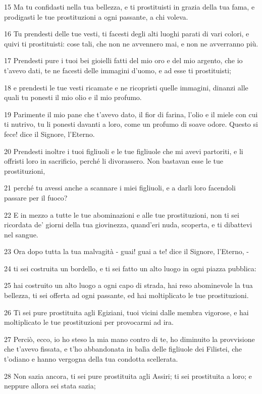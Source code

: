 \par 15 Ma tu confidasti nella tua bellezza, e ti prostituisti in grazia della tua fama, e prodigasti le tue prostituzioni a ogni passante, a chi voleva.
\par 16 Tu prendesti delle tue vesti, ti facesti degli alti luoghi parati di vari colori, e quivi ti prostituisti: cose tali, che non ne avvennero mai, e non ne avverranno più.
\par 17 Prendesti pure i tuoi bei gioielli fatti del mio oro e del mio argento, che io t'avevo dati, te ne facesti delle immagini d'uomo, e ad esse ti prostituisti;
\par 18 e prendesti le tue vesti ricamate e ne ricopristi quelle immagini, dinanzi alle quali tu ponesti il mio olio e il mio profumo.
\par 19 Parimente il mio pane che t'avevo dato, il fior di farina, l'olio e il miele con cui ti nutrivo, tu li ponesti davanti a loro, come un profumo di soave odore. Questo si fece! dice il Signore, l'Eterno.
\par 20 Prendesti inoltre i tuoi figliuoli e le tue figliuole che mi avevi partoriti, e li offristi loro in sacrificio, perché li divorassero. Non bastavan esse le tue prostituzioni,
\par 21 perché tu avessi anche a scannare i miei figliuoli, e a darli loro facendoli passare per il fuoco?
\par 22 E in mezzo a tutte le tue abominazioni e alle tue prostituzioni, non ti sei ricordata de' giorni della tua giovinezza, quand'eri nuda, scoperta, e ti dibattevi nel sangue.
\par 23 Ora dopo tutta la tua malvagità - guai! guai a te! dice il Signore, l'Eterno, -
\par 24 ti sei costruita un bordello, e ti sei fatto un alto luogo in ogni piazza pubblica:
\par 25 hai costruito un alto luogo a ogni capo di strada, hai reso abominevole la tua bellezza, ti sei offerta ad ogni passante, ed hai moltiplicato le tue prostituzioni.
\par 26 Ti sei pure prostituita agli Egiziani, tuoi vicini dalle membra vigorose, e hai moltiplicato le tue prostituzioni per provocarmi ad ira.
\par 27 Perciò, ecco, io ho steso la mia mano contro di te, ho diminuito la provvisione che t'avevo fissata, e t'ho abbandonata in balìa delle figliuole dei Filistei, che t'odiano e hanno vergogna della tua condotta scellerata.
\par 28 Non sazia ancora, ti sei pure prostituita agli Assiri; ti sei prostituita a loro; e neppure allora sei stata sazia;
